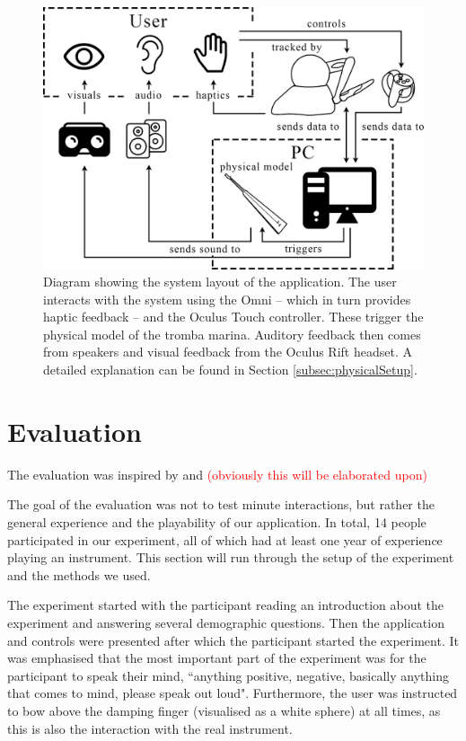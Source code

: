 \documentclass[dvipsnames, pdftex]{article}
\def\SWcomment[#1]{\textcolor{Red}{#1}}
\begin{document}
\begin{figure}[ht]\includegraphics[width=1.0\columnwidth]{SMC 2020 paper template LaTeX/figures/blockdiagram.png}
\centering
  \caption{Diagram showing the system layout of the application. The user interacts with the system using the Omni -- which in turn provides haptic feedback -- and the Oculus Touch controller. These trigger the physical model of the tromba marina. Auditory feedback then comes from speakers and visual feedback from the Oculus Rift headset. A detailed explanation can be found in Section \ref{subsec:physicalSetup}. \label{fig:systemLayout}}
\end{figure}

\section{Evaluation}
The evaluation was inspired by \cite{Young2003} \cite{Someren1994} \cite{Stowell2009} and \cite{Finstad2010} \SWcomment[(obviously this will be elaborated upon)]

The goal of the evaluation was not to test minute interactions, but rather the general experience and the playability of our application. In total, 14 people participated in our experiment, all of which had at least one year of experience playing an instrument. This section will run through the setup of the experiment and the methods we used.

The experiment started with the participant reading an introduction about the experiment and answering several demographic questions. Then the application and controls were presented after which the participant started the experiment. It was emphasised that the most important part of the experiment was for the participant to speak their mind, ``anything positive, negative, basically anything that comes to mind, please speak out loud". Furthermore, the user was instructed to bow above the damping finger (visualised as a white sphere) at all times, as this is also the interaction with the real instrument. 
\end{document}

